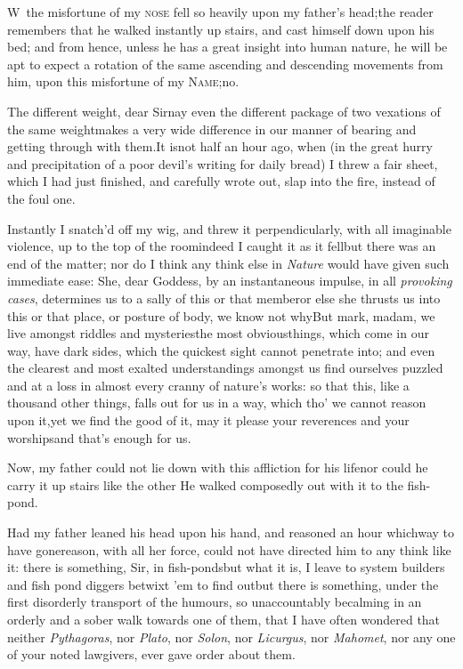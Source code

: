 \documentclass{article}
\begin{document}
\lettrine{W}{\,} the misfortune of my\break
\textsc{nose} fell so heavily upon my\break
father’s head;\tsk the reader remembers that he walked
instantly up stairs, and cast himself down upon his bed; and
from hence, unless he has a great insight into human nature,
he will be apt to expect a rotation of the same ascending
and descending movements from him, upon this misfortune of
my \textsc{Name};\tsh\break no.

The different weight, dear Sir\tsh nay even the
different package of two vexations of the same
weight\tsh makes a very wide difference in our manner of
bearing and getting through with them.\tsk It is\pb not half
an hour ago, when (in the great hurry and precipitation of a poor
devil’s writing for daily bread) I threw a fair sheet, which
I had just finished, and carefully wrote out, slap into the fire,
instead of the foul one.

Instantly I snatch’d off my wig, and threw it
perpendicularly, with all imaginable violence, up to the top of the
room\break\tsk indeed I caught it as it fell\tsk but there was
an end of the matter; nor do I think any think else in
\textit{Nature} would have given such immediate ease: She, dear
Goddess, by an instantaneous impulse, in all \textit{provoking
cases}, determines us to a sally of this or that member\tsk or
else she thrusts us into this or that place, or posture of body, we
know not why\tsk But mark, madam, we live amongst riddles
and mysteries\tsk the most obvious\pb things, which come in
our way, have dark sides, which the quickest sight cannot penetrate
into; and even the clearest and most exalted understandings amongst
us find ourselves puzzled and at a loss in almost every cranny of
nature’s works: so that this, like a thousand other things,
falls out for us in a way, which tho’ we cannot reason upon
it,\tsk yet we find the good of it, may it please your reverences
and your worships\tsh and that’s enough for us.

Now, my father could not lie down with this affliction for his
life\tsk nor could he carry it up stairs like the other\tsk
He walked composedly out with it to the fish-pond.

Had my father leaned his head upon his hand, and reasoned an
hour which\pb way to have gone\tsk reason, with all her
force, could not have directed him to any think like it: there is
something, Sir, in fish-ponds\tsk but what it is, I leave
to system builders and fish pond diggers betwixt ’em to find
out\tsk but there is something, under the first disorderly
transport of the humours, so unaccountably becalming in an orderly
and a sober walk towards one of them, that I have often wondered
that neither \textit{Pythagoras}, nor \textit{Plato}, nor \textit{Solon},
nor \textit{Licurgus}, nor \textit{Mahomet}, nor any one of your noted
lawgivers, ever gave order about them.
\end{document}
